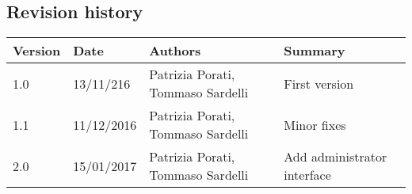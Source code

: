 \subsection{Revision history}
\begin{tabular}{|l|l|l|l|}
	\hline
	\textbf{Version}	& \textbf{Date}	& \textbf{Authors}	& \textbf{Summary}\\
	\hline
	1.0 	& 13/11/216 	& Patrizia Porati, Tommaso Sardelli 	& First version\\
	\hline
	1.1 	& 11/12/2016 	& Patrizia Porati, Tommaso Sardelli 	& Minor fixes\\
	\hline
	2.0		& 15/01/2017 	& Patrizia Porati, Tommaso Sardelli 	& Add administrator interface\\
	\hline
\end{tabular}